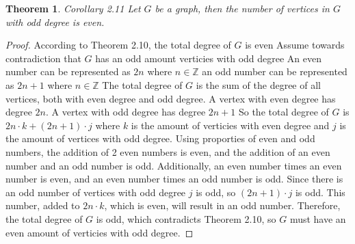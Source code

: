 \documentclass{article}
\newtheorem*{thm}{Theorem}
\begin{document}
\begin{description}
		\begin{thm}Corollary 2.11     Let $G$ be a graph, then the number of vertices in $G$ with odd degree is even. \end{thm}
 		\begin{proof}    According to Theorem 2.10,  the total degree of $G$ is even 
 			Assume towards contradiction that $G$ has an odd amount verticies with odd degree
  			An even number can be represented as $2n$ where $n \in \mathbb{Z}$ an odd number can be represented as $2n + 1$ where 
			$n \in \mathbb{Z}$
			The total degree of $G$ is the sum of the degree of all vertices, both with even degree and odd degree.
			A vertex with even degree has degree $2n$. A vertex with odd degree has degree $2n + 1$  
  			So the total degree of $G$ is $2n\cdot k + (2n+1)\cdot j$ where $k$ is the amount of verticies with even degree and $j$
			is the amount of vertices with odd degree.
  			Using proporties of even and odd numbers, the addition of 2 even numbers is even, and the addition of an even number 
			and an odd number is odd. Additionally, an even number times an even number is even, 
			and an even number times an odd number is odd.
			Since there is an odd number of vertices with odd degree $j$ is odd, so $(2n+1)\cdot j$ is odd. 
			This number, added to $2n\cdot k$, which is even, will result in an odd number. Therefore, the 
			total degree of $G$ is odd, which contradicts Theorem 2.10, so $G$ must have an even amount of verticies with odd degree.
  		\end{proof}


\end{description}
\end{document}
